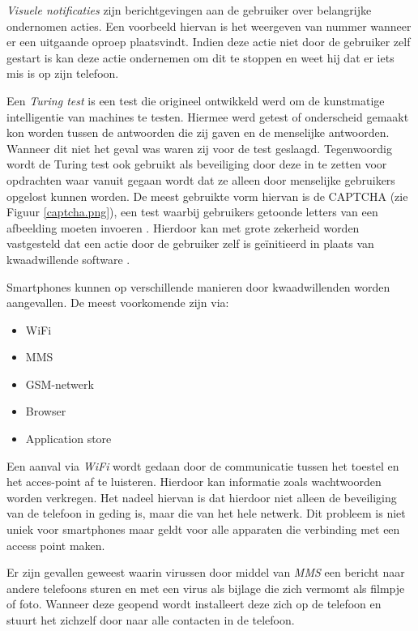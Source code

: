 \emph{Visuele notificaties} zijn berichtgevingen aan de gebruiker over belangrijke ondernomen acties. Een voorbeeld hiervan is het weergeven van nummer wanneer er een uitgaande oproep plaatsvindt. Indien deze actie niet door de gebruiker zelf gestart is kan deze actie ondernemen om dit te stoppen en weet hij dat er iets mis is op zijn telefoon. 

Een \emph{Turing test} is een test die origineel ontwikkeld werd om de kunstmatige intelligentie van machines te testen. Hiermee werd getest of onderscheid gemaakt kon worden tussen de antwoorden die zij gaven en de menselijke antwoorden. Wanneer dit niet het geval was waren zij voor de test geslaagd. Tegenwoordig wordt de Turing test ook gebruikt als beveiliging door deze in te zetten voor opdrachten waar vanuit gegaan wordt dat ze alleen door menselijke gebruikers opgelost kunnen worden. De meest gebruikte vorm hiervan is de CAPTCHA (zie Figuur \ref{captcha.png}), een test waarbij gebruikers getoonde letters van een afbeelding moeten invoeren \citep{von2003captcha}. Hierdoor kan met grote zekerheid worden vastgesteld dat een actie door de gebruiker zelf is ge\"initieerd in plaats van kwaadwillende software \citep{becher2011mobile}. 

Smartphones kunnen op verschillende manieren door kwaadwillenden worden aangevallen. De meest voorkomende zijn via:

\begin{itemize}
   \item WiFi
   \item MMS
   \item GSM-netwerk
   \item Browser
   \item Application store
\end{itemize}

Een aanval via \emph{WiFi} wordt gedaan door de communicatie tussen het toestel en het acces-point af te luisteren. Hierdoor kan informatie zoals wachtwoorden worden verkregen. Het nadeel hiervan is dat hierdoor niet alleen de beveiliging van de telefoon in geding is, maar die van het hele netwerk. Dit probleem is niet uniek voor smartphones maar geldt voor alle apparaten die verbinding met een access point maken.

Er zijn gevallen geweest waarin virussen door middel van \emph{MMS} een bericht naar andere telefoons sturen en met een virus als bijlage die zich vermomt als filmpje of foto. Wanneer deze geopend wordt installeert deze zich op de telefoon en stuurt het zichzelf door naar alle contacten in de telefoon. 

